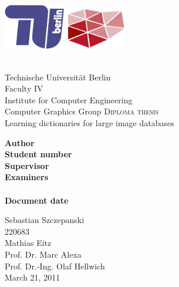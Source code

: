 
\begin{titlepage}


\includegraphics[width=0.2\textwidth]{images/logo/tu-logo_2d_blau.png}
\hfill
\includegraphics[width=0.2\textwidth]{images/logo/dgm_red.pdf}\\
\vspace{20pt}\\
\begin{center} 
Technische Universit\"{a}t Berlin\\
Faculty IV\\
Institute for Computer Engineering\\
Computer Graphics Group
\vfill
\textsc{\Large Diploma thesis}\\[0.5cm]
{\huge Learning dictionaries for large image databases}\\
[0.4cm]


\vfill
\begin{minipage}[t]{0.48\textwidth}
\flushright
\textbf{Author}\\
\textbf{Student number}\\
\textbf{Supervisor}\\
\textbf{Examiners}\\
\textbf{}\\
\textbf{Document date}
\end{minipage}
\begin{minipage}[t]{0.48\textwidth}
\flushleft 
Sebastian Szczepanski\\
220683\\
Mathias Eitz\\
Prof. Dr. Marc Alexa\\
Prof. Dr.-Ing. Olaf Hellwich\\
March 21, 2011
\end{minipage}
\end{center}

\end{titlepage}

\clearpage

